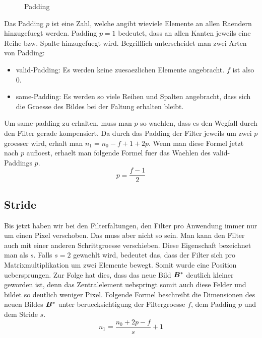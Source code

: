 \begin{figure}[h!]

  \caption{Padding}
\end{figure}

Das Padding $p$ ist eine Zahl, welche angibt wieviele Elemente an allen Raendern
hinzugefuegt werden. Padding $p = 1$ bedeutet, dass an allen Kanten jeweils eine
Reihe bzw. Spalte hinzugefuegt wird.
Begrifflich unterscheidet man zwei Arten von Padding:
\begin{itemize}
\item{valid-Padding: Es werden keine zuesaezlichen Elemente angebracht. $f$ ist also 0.}
\item{same-Padding: Es werden so viele Reihen und Spalten angebracht, dass
    sich die Groesse des Bildes bei der Faltung erhalten bleibt.}
\end{itemize}

Um same-padding zu erhalten, muss man $p$ so waehlen, dass es den Wegfall durch
den Filter gerade kompensiert. Da durch das Padding der Filter jeweils um zwei
$p$ groesser wird, erhalt man $n_1 = n_0 - f + 1 + 2p$. Wenn man diese Formel
jetzt nach $p$ aufloest, erhaelt man folgende Formel fuer das Waehlen des
valid-Paddings $p$.
\begin{equation}
  p = \frac{f-1}{2}
\end{equation}

\subsection{Stride}
Bis jetzt haben wir bei den Filterfaltungen, den Filter pro Anwendung immer nur
um einen Pixel verschoben. Das muss aber nicht so sein. Man kann den Filter
auch mit einer anderen Schrittgroesse verschieben. Diese Eigenschaft bezeichnet
man als  $s$. Falls $s = 2$ gewaehlt wird, bedeutet das, dass der
Filter sich pro Matrixmultiplikation um zwei Elemente bewegt. Somit wurde eine
Position uebersprungen. Zur Folge hat dies, dass das neue Bild $\bm{B}^*$
deutlich kleiner geworden ist, denn das Zentralelement uebspringt somit auch
diese Felder und bildet so deutlich weniger Pixel.
\para{}
Folgende Formel beschreibt die Dimensionen des neuen Bildes $\bm{B}^*$ unter
beruecksichtigung der Filtergroesse $f$, dem Padding $p$ und dem Stride $s$.
\begin{equation}
  n_1 = \frac{n_0 + 2p - f}{s} + 1
\end{equation}

